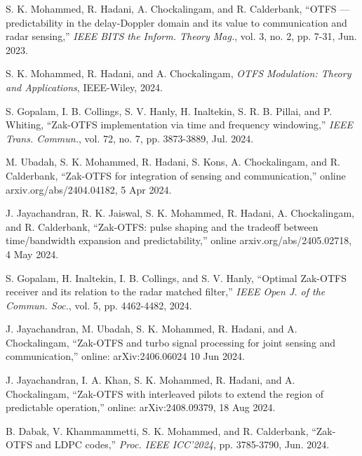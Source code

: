 \begin{thebibliography}{99}
\vspace{-2mm}
S. K. Mohammed, R. Hadani, A. Chockalingam, and R. Calderbank, ``OTFS — predictability in the delay-Doppler domain and its value to communication and radar sensing,'' {\it IEEE BITS the Inform. Theory Mag.}, vol. 3, no. 2, pp. 7-31, Jun. 2023.

\vspace{-2mm}
S. K. Mohammed, R. Hadani, and A. Chockalingam, {\em OTFS Modulation: Theory and Applications}, IEEE-Wiley, 2024.

\vspace{-2mm}
S. Gopalam, I. B. Collings, S. V. Hanly, H. Inaltekin, S. R. B. Pillai, and P. Whiting, ``Zak-OTFS implementation via time and frequency windowing,'' {\it IEEE Trans. Commun.}, vol. 72, no. 7, pp. 3873-3889, Jul. 2024.

\vspace{-2mm}
M. Ubadah, S. K. Mohammed, R. Hadani, S. Kons, A. Chockalingam, and R. Calderbank, ``Zak-OTFS for integration of sensing and communication,'' online arxiv.org/abs/2404.04182, 5 Apr 2024.

\vspace{-2mm}
J. Jayachandran, R. K. Jaiswal, S. K. Mohammed, R. Hadani, A. Chockalingam, and R. Calderbank, ``Zak-OTFS: pulse shaping and the tradeoff between time/bandwidth expansion and predictability,'' online arxiv.org/abs/2405.02718, 4 May 2024.

\vspace{-2mm}
S. Gopalam, H. Inaltekin, I. B. Collings, and S. V. Hanly, ``Optimal Zak-OTFS receiver and its relation to the radar matched filter,'' {\it IEEE Open J. of the Commun. Soc.}, vol. 5, pp. 4462-4482, 2024.

\vspace{-2mm}
J. Jayachandran, M. Ubadah, S. K. Mohammed, R. Hadani, and A. Chockalingam, ``Zak-OTFS and turbo signal processing for joint sensing and communication,'' online: arXiv:2406.06024 10 Jun 2024.

\vspace{-2mm}
J. Jayachandran, I. A. Khan, S. K. Mohammed, R. Hadani, and A. Chockalingam, ``Zak-OTFS with interleaved pilots to extend the region of predictable operation,'' online: arXiv:2408.09379, 18 Aug 2024.

\vspace{-2mm}
B. Dabak, V. Khammammetti, S. K. Mohammed, and R. Calderbank, ``Zak-OTFS and LDPC codes,'' {\it Proc. IEEE ICC'2024}, pp. 3785-3790, Jun. 2024.


\end{thebibliography}
